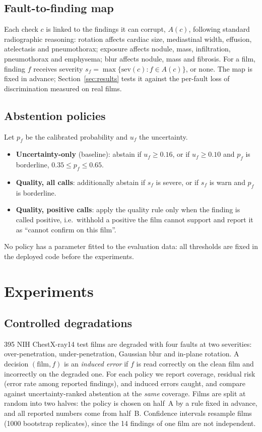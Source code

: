 \documentclass[conference]{IEEEtran}
\begin{document}
\subsection{Fault-to-finding map}
Each check $c$ is linked to the findings it can corrupt, $A(c)$, following
standard radiographic reasoning: rotation affects cardiac size, mediastinal
width, effusion, atelectasis and pneumothorax; exposure affects nodule, mass,
infiltration, pneumothorax and emphysema; blur affects nodule, mass and
fibrosis. For a film, finding $f$ receives severity
$s_f = \max\{\text{sev}(c) : f \in A(c)\}$, or none. The map is fixed in advance;
Section~\ref{sec:results} tests it against the per-fault loss of discrimination
measured on real films.

\subsection{Abstention policies}
Let $p_f$ be the calibrated probability and $u_f$ the uncertainty.
\begin{itemize}
\item \textbf{Uncertainty-only} (baseline): abstain if $u_f \ge 0.16$, or if
$u_f \ge 0.10$ and $p_f$ is borderline, $0.35 \le p_f \le 0.65$.
\item \textbf{Quality, all calls}: additionally abstain if $s_f$ is severe, or if
$s_f$ is warn and $p_f$ is borderline.
\item \textbf{Quality, positive calls}: apply the quality rule only when the
finding is called positive, i.e.\ withhold a positive the film cannot support
and report it as ``cannot confirm on this film''.
\end{itemize}
No policy has a parameter fitted to the evaluation data: all thresholds are
fixed in the deployed code before the experiments.

\section{Experiments}

\subsection{Controlled degradations}
395 NIH ChestX-ray14 test films are degraded with four faults at two
severities: over-penetration, under-penetration, Gaussian blur and in-plane
rotation. A decision $(\text{film},f)$ is an \emph{induced error} if $f$ is read
correctly on the clean film and incorrectly on the degraded one. For each
policy we report coverage, residual risk (error rate among reported findings),
and induced errors caught, and compare against uncertainty-ranked abstention at
the \emph{same} coverage. Films are split at random into two halves: the policy
is chosen on half~A by a rule fixed in advance, and all reported numbers come
from half~B. Confidence intervals resample films (1000 bootstrap replicates),
since the 14 findings of one film are not independent.
\end{document}
